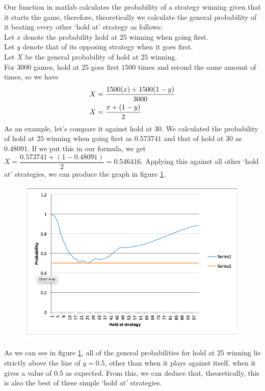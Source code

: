 \documentclass[a4paper,titlepage]{article}
\begin{document}
Our function in matlab calculates the probability of a strategy winning given that it starts the game, therefore, theoretically we calculate the general probability of it beating every other ‘hold at’ strategy as follows:\\
Let $x$ denote the probability hold at $25$ winning when going first.\\
Let $y$ denote that of its opposing strategy when it goes first.\\
Let $X$ be the general probability of hold at $25$ winning.\\
For $3000$ games, hold at $25$ goes first $1500$ times and second the same amount of times, so we have
\begin{align}
X &= \dfrac{1500(x)+1500(1-y)}{3000}\notag\\
X &= \dfrac{x+(1-y)}{2}\notag
\end{align}
As an example, let’s compare it against hold at $30$. We calculated the probability of hold at $25$ winning when going first as $0.573741$ and that of hold at $30$ as $0.48091$. If we put this in our formula, we get\\ $X=\dfrac{0.573741+(1-0.48091)}{2}=0.546416$. Applying this against all other ‘hold at’ strategies, we can produce the graph in figure \ref{figure7}.
\begin{figure}
\centering
\includegraphics[width=\textwidth]{stats_3}
\caption{\label{figure7}}
\end{figure}
As we can see in figure \ref{figure7}, all of the general probabilities for hold at $25$ winning lie strictly above the line of $y=0.5$, other than when it plays against itself, when it gives a value of $0.5$ as expected. From this, we can deduce that, theoretically, this is also the best of these simple ‘hold at’ strategies.\\ \\
\end{document}
